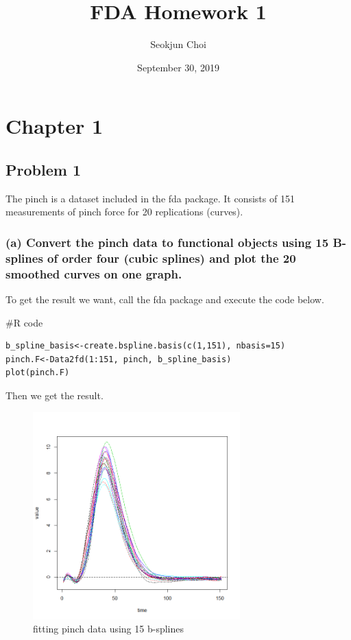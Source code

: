 \documentclass{article}
\newenvironment{Rcode}%
{%
    \begin{mdframed}
    \#R code
    \begin{small}
}
{%
    \end{small}
    \end{mdframed}
}
\begin{document}
\title{FDA Homework 1}
\author{Seokjun Choi}
\date{September 30, 2019}
\maketitle

\section{Chapter 1}
\subsection{Problem 1}

The pinch is a dataset included in the fda package. It consists of 151 measurements of pinch force for 20 replications (curves). 

\subsubsection*{(a)  Convert the pinch data to functional objects using 15 B-splines of order four (cubic splines) and plot the 20 smoothed curves on one graph.}
To get the result we want, call the fda package and execute the code below.

\begin{Rcode}
    \begin{verbatim}
b_spline_basis<-create.bspline.basis(c(1,151), nbasis=15)
pinch.F<-Data2fd(1:151, pinch, b_spline_basis)
plot(pinch.F)
    \end{verbatim}
\end{Rcode}
Then we get the result.
\begin{figure}[hh]
    \centering
    \includegraphics[height=8cm]{pinch_F_plot.png}
    \caption{fitting pinch data using 15 b-splines}
\end{figure}
\end{document}
